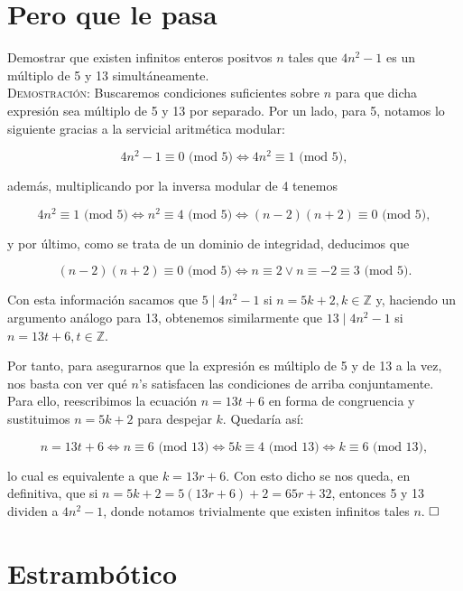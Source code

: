 \documentclass{article}
\begin{document}
\newpage

\section{Pero que le pasa}

Demostrar que existen infinitos enteros positvos $n$ tales que $4n^2 - 1$ es un múltiplo de 5 y 13 simultáneamente. \\

\noindent\textsc{Demostración:} Buscaremos condiciones suficientes sobre $n$ para que dicha expresión sea múltiplo de 5 y 13 por separado. Por un lado, para 5, notamos lo siguiente gracias a la servicial aritmética modular:

\[4n^2 - 1 \equiv 0 \text{ (mod 5)} \iff 4n^2 \equiv 1 \text{ (mod 5)},\]

\noindent además, multiplicando por la inversa modular de 4 tenemos

\[4n^2 \equiv 1 \text{ (mod 5)} \iff n^2 \equiv 4 \text{ (mod 5)} \iff (n - 2)(n + 2) \equiv 0 \text{ (mod 5)},\]

\noindent y por último, como se trata de un dominio de integridad, deducimos que

\[(n - 2)(n + 2) \equiv 0 \text{ (mod 5)} \iff n \equiv 2 \lor n \equiv -2 \equiv 3 \text{ (mod 5)}.\]

Con esta información sacamos que $5 \mid 4n^2 - 1$ si $n = 5k + 2, k \in \mathbb{Z}$ y, haciendo un argumento análogo para 13, obtenemos similarmente que $13 \mid 4n^2 - 1$ si $n = 13t + 6, t \in \mathbb{Z}$.

Por tanto, para asegurarnos que la expresión es múltiplo de 5 y de 13 a la vez, nos basta con ver qué $n$'s satisfacen las condiciones de arriba conjuntamente. Para ello, reescribimos la ecuación $n = 13t + 6$ en forma de congruencia y sustituimos $n = 5k + 2$ para despejar $k$. Quedaría así:

\[n = 13t + 6 \iff n \equiv 6 \text{ (mod 13)} \iff 5k \equiv 4 \text{ (mod 13)} \iff k \equiv 6 \text{ (mod 13)},\]

\noindent lo cual es equivalente a que $k = 13r + 6$. Con esto dicho se nos queda, en definitiva, que si $n = 5k + 2 = 5(13r + 6) + 2 = 65r + 32$, entonces 5 y 13 dividen a $4n^2 - 1$, donde notamos trivialmente que existen infinitos tales $n$. $\hfill\square$

\newpage

\section{Estrambótico}
\end{document}
